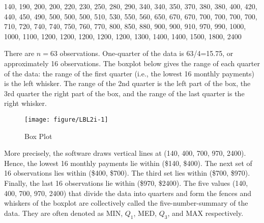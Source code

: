 \documentclass[11pt]{book}\usepackage[]{graphicx}\usepackage[]{color}
\begin{document}
{\small{
140, 190, 200, 200, 220, 230, 250, 280, 290, 340, 340, 350, 370, 380, 380, 400, 420, 440, 450, 490, 500, 500, 500, 510, 530, 550, 560, 650, 670, 670, 700, 700, 700, 700, 710, 720, 740, 740, 750, 760, 770, 800, 850, 880, 900, 900, 910, 970, 990, 1000, 1000, 1100, 1200, 1200, 1200, 1200, 1200, 1300, 1400, 1400, 1500, 1800, 2400
}}

There are $n = 63$ observations.  One-quarter of the data is 63/4=15.75, or approximately 16 observations.  The boxplot below gives the range of each quarter of the data: the range of the first quarter (i.e., the lowest 16 monthly payments) is the left whisker.  The range of the 2nd quarter is the left part of the box, the 3rd quarter the right part of the box, and the range of the last quarter is the right whisker.

\begin{figure}[ht]

\caption{Box Plot }



{\centering \texttt{[image: figure/LBL2i-1]} 

}




\end{figure}

More precisely, the software draws vertical lines at (140, 400, 700, 970, 2400).  Hence, the lowest 16 monthly payments lie within (\$140, \$400).  The next set of 16 observations lies within (\$400, \$700).  The third set lies within (\$700, \$970).  Finally, the last 16 observations lie within (\$970, \$2400).  The five values (140, 400, 700, 970, 2400) that divide the data into quarters and form the fences and whiskers of the boxplot are collectively called the five-number-summary of the data.  They are often denoted as MIN, $Q_1$, MED, $Q_3$, and MAX respectively.

\newpage
\end{document}
